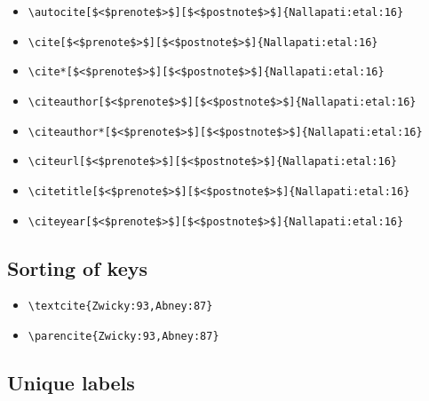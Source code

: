 \begin{itemize}
\item \verb=\autocite[$<$prenote$>$][$<$postnote$>$]{Nallapati:etal:16}= \newline  \autocite[$<$prenote$>$][$<$postnote$>$]{Nallapati:etal:16}
\item \verb=\cite[$<$prenote$>$][$<$postnote$>$]{Nallapati:etal:16}= \newline  \cite[$<$prenote$>$][$<$postnote$>$]{Nallapati:etal:16}
\item \verb=\cite*[$<$prenote$>$][$<$postnote$>$]{Nallapati:etal:16}= \newline  \cite*[$<$prenote$>$][$<$postnote$>$]{Nallapati:etal:16}
\item \verb=\citeauthor[$<$prenote$>$][$<$postnote$>$]{Nallapati:etal:16}= \newline \citeauthor[$<$prenote$>$][$<$postnote$>$]{Nallapati:etal:16}
\item \verb=\citeauthor*[$<$prenote$>$][$<$postnote$>$]{Nallapati:etal:16}= \newline \citeauthor*[$<$prenote$>$][$<$postnote$>$]{Nallapati:etal:16}
\item \verb=\citeurl[$<$prenote$>$][$<$postnote$>$]{Nallapati:etal:16}= \newline {}
\item \verb=\citetitle[$<$prenote$>$][$<$postnote$>$]{Nallapati:etal:16}= \newline {}
\item \verb=\citeyear[$<$prenote$>$][$<$postnote$>$]{Nallapati:etal:16}= \newline \citeyear[$<$prenote$>$][$<$postnote$>$]{Nallapati:etal:16}
\end{itemize} 

\subsection{Sorting of keys}

\begin{itemize}
\item \verb=\textcite{Zwicky:93,Abney:87}= \newline \textcite{Zwicky:93,Abney:87}
\item \verb=\parencite{Zwicky:93,Abney:87}= \newline \parencite{Zwicky:93,Abney:87}
\end{itemize}

\subsection{Unique labels}

